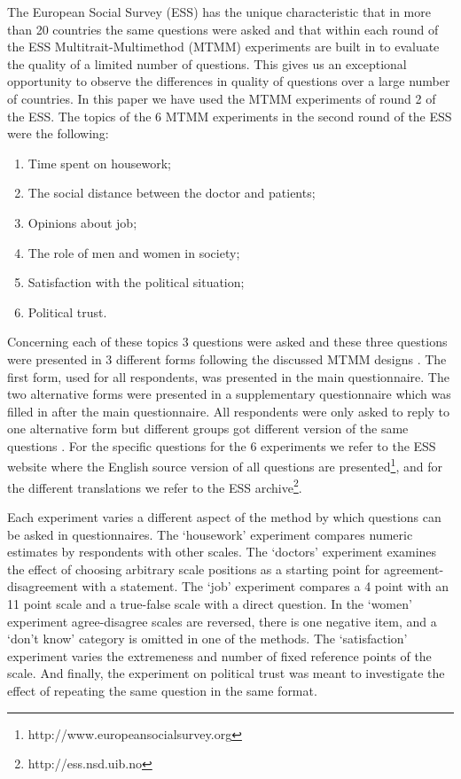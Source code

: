 \documentclass[a4paper,12pt]{article}
\begin{document}
The European Social Survey (ESS) has the unique characteristic that in more than 20 countries the same questions were asked and that within each round of the ESS Multitrait-Multimethod (MTMM) experiments are built in to evaluate the quality of a limited number of questions. This gives us an exceptional opportunity to observe the differences in quality of questions over a large number of countries. In this paper we have used the MTMM experiments of round 2 of the ESS. The topics of the 6 MTMM experiments in the second round of the ESS were the following:
\begin{enumerate}
\item Time spent on housework;
\item The social distance between the doctor and patients;
\item Opinions about job;
\item The role of men and women in society;
\item Satisfaction with the political situation;
\item Political trust.
\end{enumerate}
Concerning each of these topics 3 questions were asked and these three questions were presented in 3 different forms following the discussed MTMM designs 
\cite{campbell_convergent_1959}. The first form,  used for all respondents, was presented in the main questionnaire. The two alternative forms were presented in a supplementary questionnaire which was filled in after the main questionnaire. All respondents were only asked to reply to one alternative form but different groups got different version of the same questions \cite{saris_new_2004}. For the specific questions for the 6 experiments we refer to the ESS website where the English source version of all questions are presented\footnote{http://www.europeansocialsurvey.org}, and for the different translations we refer to the ESS archive\footnote{http://ess.nsd.uib.no}.

	Each experiment varies a different aspect of the method by which questions can be asked in questionnaires. The `housework' experiment compares numeric estimates by respondents with other scales. The `doctors' experiment examines the effect of choosing arbitrary scale positions as a starting point for agreement-disagreement with a statement. The `job' experiment compares a 4 point with an 11 point scale and a true-false scale with a direct question. In the `women' experiment agree-disagree scales are reversed, there is one negative item, and a `don't know' category is omitted in one of the methods.  The `satisfaction' experiment varies the extremeness and number of fixed reference points of the scale. And finally, the experiment on political trust was meant to investigate the effect of repeating the same question in the same format.
\end{document}
